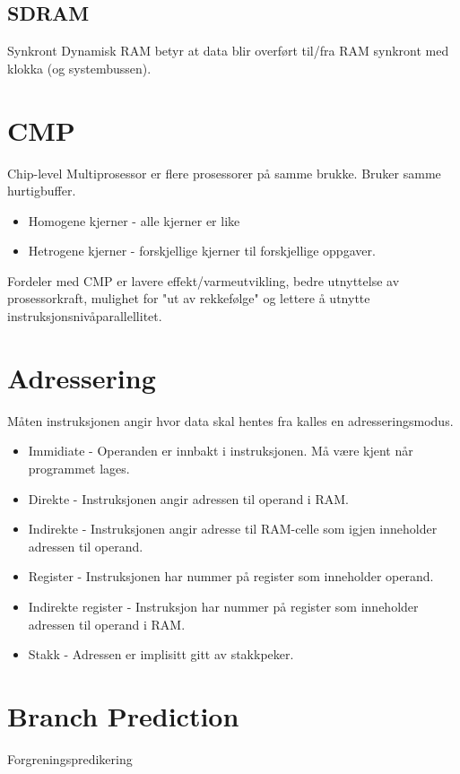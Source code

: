 \documentclass[a4paper, 10pt]{article}
\begin{document}
\subsection{SDRAM} 
Synkront Dynamisk RAM betyr at data blir overført til/fra RAM synkront med klokka (og systembussen).

\section{CMP}
Chip-level Multiprosessor er flere prosessorer på samme brukke. Bruker samme hurtigbuffer.

\begin{itemize}
	\item Homogene kjerner - alle kjerner er like
	\item Hetrogene kjerner - forskjellige kjerner til forskjellige oppgaver.
\end{itemize}

Fordeler med CMP er lavere effekt/varmeutvikling, bedre utnyttelse av prosessorkraft, mulighet for "ut av rekkefølge" og lettere å utnytte instruksjonsnivåparallellitet.

\section{Adressering}
Måten instruksjonen angir hvor data skal hentes fra kalles en adresseringsmodus.

\begin{itemize}
	\item Immidiate - Operanden er innbakt i instruksjonen. Må være kjent når programmet lages.
	\item Direkte - Instruksjonen angir adressen til operand i RAM.
	\item Indirekte - Instruksjonen angir adresse til RAM-celle som igjen inneholder adressen til operand.
	\item Register - Instruksjonen har nummer på register som inneholder operand.
	\item Indirekte register - Instruksjon har nummer på register som inneholder adressen til operand i RAM.
	\item Stakk - Adressen er implisitt gitt av stakkpeker.
\end{itemize}


\section{Branch Prediction}
Forgreningspredikering
\end{document}
